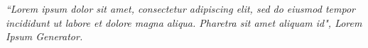 
\renewcommand{\epigraphname}{EPÍGRAFE}

\begin{epigrafe}

\textit{``Lorem ipsum dolor sit amet, consectetur adipiscing elit, sed do eiusmod tempor incididunt ut labore et dolore magna aliqua. Pharetra sit amet aliquam id", Lorem Ipsum Generator.}

\end{epigrafe}



